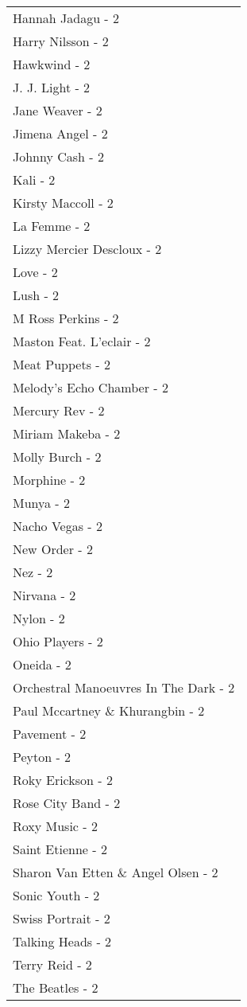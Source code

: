 \documentclass[
]{article}
\begin{document}
\begin{longtable}{l}
Hannah Jadagu - 2 \\ 
Harry Nilsson - 2 \\ 
Hawkwind - 2 \\ 
J. J. Light - 2 \\ 
Jane Weaver - 2 \\ 
Jimena Angel - 2 \\ 
Johnny Cash - 2 \\ 
Kali - 2 \\ 
Kirsty Maccoll - 2 \\ 
La Femme - 2 \\ 
Lizzy Mercier Descloux - 2 \\ 
Love - 2 \\ 
Lush - 2 \\ 
M Ross Perkins - 2 \\ 
Maston Feat. L'eclair - 2 \\ 
Meat Puppets - 2 \\ 
Melody's Echo Chamber - 2 \\ 
Mercury Rev - 2 \\ 
Miriam Makeba - 2 \\ 
Molly Burch - 2 \\ 
Morphine - 2 \\ 
Munya - 2 \\ 
Nacho Vegas - 2 \\ 
New Order - 2 \\ 
Nez - 2 \\ 
Nirvana - 2 \\ 
Nylon - 2 \\ 
Ohio Players - 2 \\ 
Oneida - 2 \\ 
Orchestral Manoeuvres In The Dark - 2 \\ 
Paul Mccartney \& Khurangbin - 2 \\ 
Pavement - 2 \\ 
Peyton - 2 \\ 
Roky Erickson - 2 \\ 
Rose City Band - 2 \\ 
Roxy Music - 2 \\ 
Saint Etienne - 2 \\ 
Sharon Van Etten \& Angel Olsen - 2 \\ 
Sonic Youth - 2 \\ 
Swiss Portrait - 2 \\ 
Talking Heads - 2 \\ 
Terry Reid - 2 \\ 
The Beatles - 2 \\ 

\end{longtable}
\end{document}
